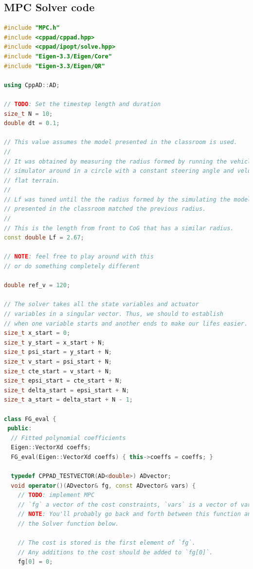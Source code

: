\documentclass[11pt]{article}
\begin{document}
\subsection{MPC Solver code}

\begin{lstlisting}[language=C++, caption={MPC solver with ipopt}]
#include "MPC.h"
#include <cppad/cppad.hpp>
#include <cppad/ipopt/solve.hpp>
#include "Eigen-3.3/Eigen/Core"
#include "Eigen-3.3/Eigen/QR"

using CppAD::AD;

// TODO: Set the timestep length and duration
size_t N = 10;
double dt = 0.1;

// This value assumes the model presented in the classroom is used.
//
// It was obtained by measuring the radius formed by running the vehicle in the
// simulator around in a circle with a constant steering angle and velocity on a
// flat terrain.
//
// Lf was tuned until the the radius formed by the simulating the model
// presented in the classroom matched the previous radius.
//
// This is the length from front to CoG that has a similar radius.
const double Lf = 2.67;

// NOTE: feel free to play around with this
// or do something completely different

double ref_v = 120;

// The solver takes all the state variables and actuator
// variables in a singular vector. Thus, we should to establish
// when one variable starts and another ends to make our lifes easier.
size_t x_start = 0;
size_t y_start = x_start + N;
size_t psi_start = y_start + N;
size_t v_start = psi_start + N;
size_t cte_start = v_start + N;
size_t epsi_start = cte_start + N;
size_t delta_start = epsi_start + N;
size_t a_start = delta_start + N - 1;

class FG_eval {
 public:
  // Fitted polynomial coefficients
  Eigen::VectorXd coeffs;
  FG_eval(Eigen::VectorXd coeffs) { this->coeffs = coeffs; }

  typedef CPPAD_TESTVECTOR(AD<double>) ADvector;
  void operator()(ADvector& fg, const ADvector& vars) {
    // TODO: implement MPC
    // `fg` a vector of the cost constraints, `vars` is a vector of variable values (state & actuators)
    // NOTE: You'll probably go back and forth between this function and
    // the Solver function below.

    // The cost is stored is the first element of `fg`.
    // Any additions to the cost should be added to `fg[0]`.
    fg[0] = 0;


\end{lstlisting}
\end{document}

